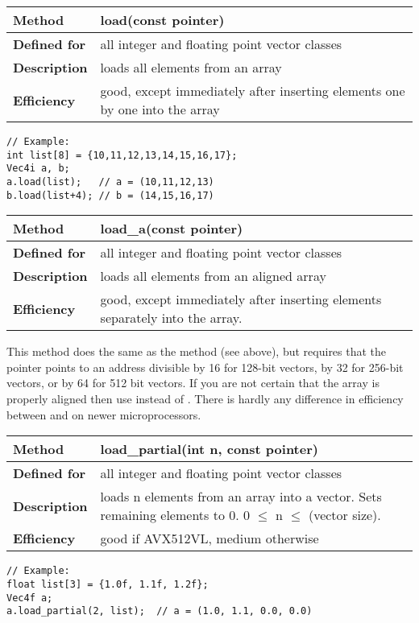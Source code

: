 \documentclass[vcl_manual.tex]{subfiles}
\begin{document}
\begin{tabular}{|p{25mm}|p{100mm}|}
\hline
\bfseries Method & load(const pointer) \\ \hline
\bfseries Defined for & all integer and floating point vector classes \\ \hline
\bfseries Description & loads all elements from an array \\ \hline
\bfseries Efficiency & good, except immediately after inserting elements one by one into the array \\ \hline
\end{tabular}
\begin{lstlisting}[frame=none]
// Example:
int list[8] = {10,11,12,13,14,15,16,17};
Vec4i a, b;
a.load(list);   // a = (10,11,12,13)
b.load(list+4); // b = (14,15,16,17)
\end{lstlisting}

\begin{tabular}{|p{25mm}|p{100mm}|}
\hline
\bfseries Method & load\_a(const pointer) \\ \hline
\bfseries Defined for & all integer and floating point vector classes \\ \hline
\bfseries Description & loads all elements from an aligned array \\ \hline
\bfseries Efficiency & good, except immediately after inserting elements separately into the array. \\ \hline
\end{tabular}

This method does the same as the  method (see above), but requires that the pointer points to an address divisible by 16 for 128-bit vectors, by 32 for 256-bit vectors, or by 64 for 512 bit vectors. If you are not certain that the array is properly aligned then use  instead of . There is hardly any difference in efficiency between  and  on newer microprocessors.

\begin{tabular}{|p{25mm}|p{100mm}|}
\hline
\bfseries Method & load\_partial(int n, const pointer) \\ \hline
\bfseries Defined for & all integer and floating point vector classes \\ \hline
\bfseries Description & loads n elements from an array into a vector. Sets remaining elements to 0. 0 $\leq$ n $\leq$ (vector size). \\ \hline
\bfseries Efficiency & good if AVX512VL, medium otherwise \\ \hline
\end{tabular}
\begin{lstlisting}[frame=none]
// Example:
float list[3] = {1.0f, 1.1f, 1.2f};
Vec4f a;
a.load_partial(2, list);  // a = (1.0, 1.1, 0.0, 0.0)
\end{lstlisting}
\end{document}
